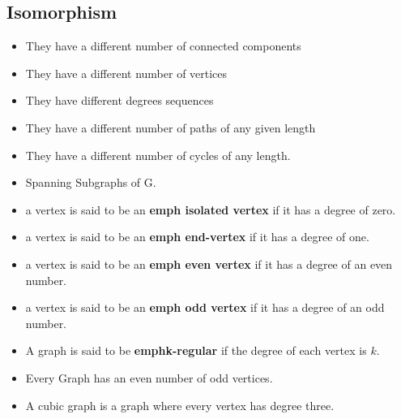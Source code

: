 \documentclass[]{report}
\begin{document}
\subsection*{Isomorphism}
\begin{itemize}
\item They have a different number of connected components
\item They have a different number of vertices
\item They have different degrees sequences
\item They have a different number of paths of any given length
\item They have a different number of cycles of any length.
\end{itemize}




\begin{itemize}
\item Spanning Subgraphs of G.

\item a vertex is said to be an \textbf{emph{ isolated vertex}} if it has a degree of zero.
\item a vertex is said to be an \textbf{emph{ end-vertex}} if it has a degree of one.
\item a vertex is said to be an \textbf{emph{ even vertex}} if it has a degree of an even number.
\item a vertex is said to be an \textbf{emph{ odd vertex}} if it has a degree of an odd number.


\item A graph is said to be \textbf{emph{k-regular}} if the degree of each vertex is $k$. 
\item Every Graph has an even number of odd vertices.
\item A cubic graph is a graph where every vertex has degree three.
\end{itemize}
\end{document}
